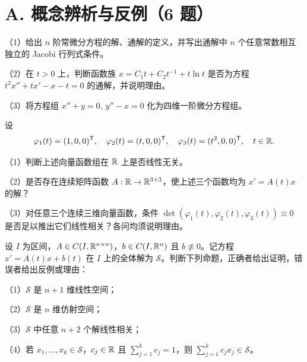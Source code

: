 \section{A. 概念辨析与反例（6 题）}
\noindent\begin{minipage}{\linewidth}
\par（1）给出 $n$ 阶常微分方程的解、通解的定义，并写出通解中 $n$ 个任意常数相互独立的 Jacobi 行列式条件。
\par（2）在 $t>0$ 上，判断函数族 $x=C_1t+C_2t^{-1}+t\ln t$ 是否为方程 $t^2x''+tx'-x-t=0$ 的通解，并说明理由。
\par（3）将方程组 $x''+y=0,\ y''-x=0$ 化为四维一阶微分方程组。
\end{minipage}\par\vspace{5pt}
\noindent\begin{minipage}{\linewidth}
设
\[\varphi_1(t)=(1,0,0)^{\mathsf T},\quad\varphi_2(t)=(t,0,0)^{\mathsf T},\quad\varphi_3(t)=(t^2,0,0)^{\mathsf T},\quad t\in\mathbb R.\]
\par（1）判断上述向量函数组在 $\mathbb R$ 上是否线性无关。
\par（2）是否存在连续矩阵函数 $A:\mathbb R\to\mathbb R^{3\times3}$，使上述三个函数均为 $x'=A(t)x$ 的解？
\par（3）对任意三个连续三维向量函数，条件 $\det(\varphi_1(t),\varphi_2(t),\varphi_3(t))\equiv0$ 是否足以推出它们线性相关？各问均须说明理由。
\end{minipage}\par\vspace{5pt}
\noindent\begin{minipage}{\linewidth}
设 $I$ 为区间，$A\in C(I,\mathbb R^{n\times n})$，$b\in C(I,\mathbb R^n)$ 且 $b\not\equiv0$。记方程 $x'=A(t)x+b(t)$ 在 $I$ 上的全体解为 $\mathcal S$。判断下列命题，正确者给出证明，错误者给出反例或理由：
\par（1）$\mathcal S$ 是 $n+1$ 维线性空间；\par（2）$\mathcal S$ 是 $n$ 维仿射空间；\par（3）$\mathcal S$ 中任意 $n+2$ 个解线性相关；\par（4）若 $x_1,\ldots,x_k\in\mathcal S$，$c_j\in\mathbb R$ 且 $\sum_{j=1}^k c_j=1$，则 $\sum_{j=1}^k c_jx_j\in\mathcal S$。
\end{minipage}\par\vspace{5pt}

